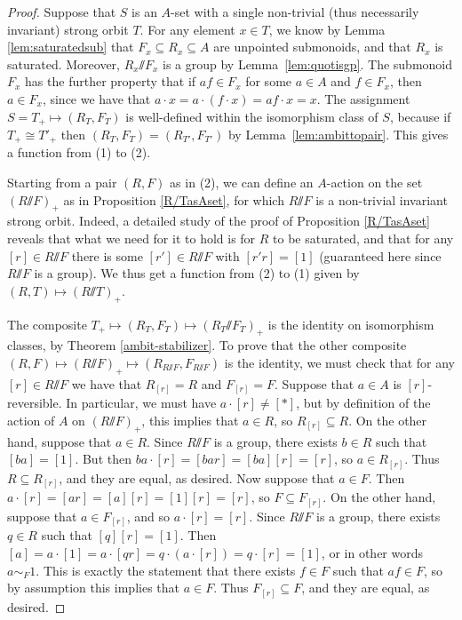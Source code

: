 \documentclass[11pt]{amsart}
\renewcommand{\ss}{\mathord{\sslash}}
\begin{document}
\begin{proof}
    Suppose that $S$ is an $A$-set with a single non-trivial (thus necessarily invariant) strong orbit $T$.  For any element $x\in T$, we know by Lemma \ref{lem:saturatedsub} that $F_x\subseteq R_x \subseteq A$ are unpointed submonoids, and that $R_x$ is saturated. Moreover,  $R_x\ss F_x$ is a group by Lemma~\ref{lem:quotisgp}.  The submonoid $F_x$ has the further property that if $af\in F_x$ for some $a\in A$ and $f\in F_x$, then $a\in F_x$, since we have that $a\cdot x=a\cdot (f\cdot x)=af\cdot x=x$.    The assignment $S=T_+\mapsto (R_T, F_T)$ is well-defined within the isomorphism class of $S$, because if $T_+\cong T'_+$ then $(R_T,F_T) = (R_{T'},F_{T'})$ by Lemma~\ref{lem:ambittopair}.  This gives a function from (1) to (2).

Starting from a pair $(R,F)$ as in (2), we can define an $A$-action on the set $(R\ss F)_+$ as in Proposition \ref{R/TasAset}, for which $R\ss F$ is a non-trivial invariant strong orbit. Indeed, a detailed study of the proof of Proposition \ref{R/TasAset} reveals that what we need for it to hold is for $R$ to be saturated, and that for any $[r]\in R\ss F$ there is some $[r']\in R\ss F$ with $[r'r]=[1]$ (guaranteed here since $R\ss F$ is a group). We thus get a function from (2) to (1) given by $(R,T)\mapsto (R\ss T)_+$. 

The composite $T_+\mapsto (R_T, F_T)\mapsto (R_T\ss F_T)_+$ is the identity on isomorphism classes, by Theorem \ref{ambit-stabilizer}. To prove that the other composite $(R,F)\mapsto (R\ss F)_+\mapsto (R_{R\ss F}, F_{R\ss F})$ is the identity, 
 we must check that for any $[r]\in R\ss F$ we have that $R_{[r]} = R$ and $F_{[r]} = F$.  Suppose that $a\in A$ is $[r]$-reversible.  In particular, we must have $a \cdot [r] \neq [*]$, but by definition of the action of $A$ on $(R\ss F)_+$, this implies that $a\in R$, so $R_{[r]} \subseteq R$.  On the other hand, suppose that $a\in R$.  Since $R\ss F$ is a group, there exists $b\in R$ such that $[ba]=[1]$.  But then $ba\cdot [r] = [bar] = [ba][r]=[r]$, so $a\in R_{[r]}$.  Thus $R \subseteq R_{[r]}$, and they are equal, as desired.  Now suppose that $a\in F$.  Then $a \cdot [r] = [ar] = [a][r]=[1][r]=[r]$, so $F \subseteq F_{[r]}$.  On the other hand, suppose that $a\in F_{[r]}$, and so $a\cdot [r] = [r]$.  Since $R \ss F$ is a group, there exists $q\in R$ such that $[q][r]=[1]$.  Then 
 $[a]=a\cdot [1]=a\cdot [qr]=q\cdot (a\cdot [r])=q\cdot [r]=[1]$, or in other words $a \sim_F 1$.
 This is exactly the statement that there exists $f\in F$ such that $af\in F$, so by assumption this implies that $a\in F$.  Thus $F_{[r]} \subseteq F$, and they are equal, as desired.  
\end{proof}
\end{document}
